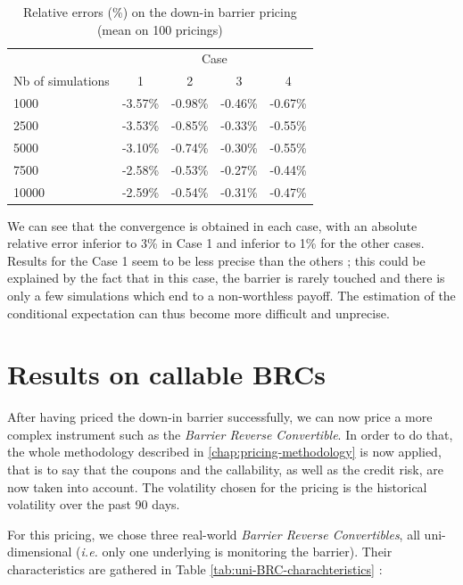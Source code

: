 \documentclass[a4paper,11pt,english]{book}
\begin{document}
\begin{table}
\centering
\begin{tabular}{l c c c c} 
& \multicolumn{4}{c}{Case} \\ 
\cmidrule(l){2-5} 
Nb of simulations & 1 & 2 & 3 & 4\\ %
\midrule %
1000 & -3.57\% & -0.98\% & -0.46\% & -0.67\%\\ %
2500 & -3.53\% & -0.85\% & -0.33\% & -0.55\%\\ %
5000 & -3.10\% & -0.74\% & -0.30\% & -0.55\%\\ %
7500 & -2.58\% & -0.53\% & -0.27\% & -0.44\%\\ %
10000 & -2.59\% & -0.54\% & -0.31\% & -0.47\%\\ %
\bottomrule %
\end{tabular}
\caption{Relative errors (\%) on the down-in barrier pricing (mean on 100 pricings)}
\label{tab:barrier-option-pricing}
\end{table}

We can see that the convergence is obtained in each case, with an absolute relative error inferior to 3\% in Case 1 and inferior to 1\% for the other cases. Results for the Case 1 seem to be less precise than the others ; this could be explained by the fact that in this case, the barrier is rarely touched and there is only a few simulations which end to a non-worthless payoff. The estimation of the conditional expectation can thus become more difficult and unprecise.

\section{Results on callable BRCs}
\label{sec:callable-BRC}
After having priced the down-in barrier successfully, we can now price a more complex instrument such as the \textit{Barrier Reverse Convertible}. In order to do that, the whole methodology described in \ref{chap:pricing-methodology} is now applied, that is to say that the coupons and the callability, as well as the credit risk, are now taken into account. The volatility chosen for the pricing is the historical volatility over the past 90 days.

For this pricing, we chose three real-world \textit{Barrier Reverse Convertibles}, all uni-dimensional (\textit{i.e.} only one underlying is monitoring the barrier). Their characteristics are gathered in Table \ref{tab:uni-BRC-charachteristics} :
\end{document}
